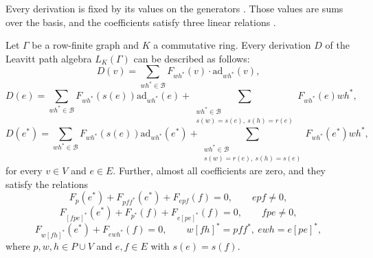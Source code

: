 Every derivation is fixed by its values on the generators
\cite[pp.~63--64]{Lopatkin2019}. Those values are sums over the basis, and the
coefficients satisfy three linear relations \cite[pp.~63--64]{Lopatkin2019}.

\begin{theorem}\label{thm:leavitt:form}
Let $\Gamma$ be a row-finite graph and $K$ a commutative ring. Every derivation $D$
of the Leavitt path algebra $L_{K}(\Gamma)$ can be described as follows:
\begin{equation*}
D(v)=\sum_{wh^{*}\in\mathcal B}F_{wh^{*}}(v)\cdot\mathrm{ad}_{wh^{*}}(v),
\end{equation*}
\begin{equation*}
D(e)=\sum_{wh^{*}\in\mathcal B}F_{wh^{*}}(s(e))\mathrm{ad}_{wh^{*}}(e)
+\sum_{\substack{wh^{*}\in\mathcal B\\ s(w)=s(e),\ s(h)=r(e)}}F_{wh^{*}}(e)wh^{*},
\end{equation*}
\begin{equation*}
D(e^{*})=\sum_{wh^{*}\in\mathcal B}F_{wh^{*}}(s(e))\mathrm{ad}_{wh^{*}}(e^{*})
+\sum_{\substack{wh^{*}\in\mathcal B\\ s(w)=r(e),\ s(h)=s(e)}}F_{wh^{*}}(e^{*})wh^{*},
\end{equation*}
for every $v\in V$ and $e\in E$. Further, almost all coefficients are zero, and they
satisfy the relations
\begin{equation*}
F_{p}(e^{*})+F_{pf\!f^{*}}(e^{*})+F_{epf}(f)=0,\qquad epf\neq 0,
\end{equation*}
\begin{equation*}
F_{[f\!pe]^{*}}(e^{*})+F_{p^{*}}(f)+F_{e[pe]^{*}}(f)=0,\qquad f\!pe\neq 0,
\end{equation*}
\begin{equation*}
F_{w[fh]^{*}}(e^{*})+F_{ewh^{*}}(f)=0,\qquad w[fh]^{*}=pf\!f^{*},\ ewh=e[pe]^{*},
\end{equation*}
where $p,w,h\in P\cup V$ and $e,f\in E$ with $s(e)=s(f)$.
\end{theorem}

